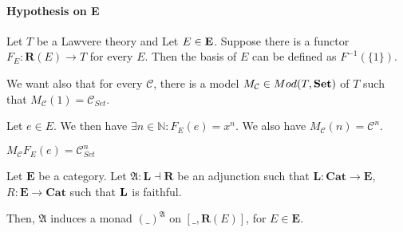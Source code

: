 \documentclass{report}
\begin{document}
\paragraph{Hypothesis on E}
Let $T$ be a Lawvere theory and
Let $E\in \bf E$.   Suppose there is a functor $F_E : \textbf{R}(E) \rightarrow T$ for every $E$. Then the basis of $E$ can be defined as $F^{-1}(\{1\})$.

We want also that for every $\mathcal{C}$, there is a model  $M_{\mathcal{C}}\in Mod(T,\bf Set)$ of $T$ such that $M_\mathcal{C}(1) = \mathcal{C}_{Set}$.

Let $e\in E$. We then have $\exists n \in \mathbb{N}  : F_E(e) = x^n$.  We also have $M_\mathcal{C}(n) = \mathcal{C}^n$.

$M_\mathcal{C}F_E(e) = \mathcal{C}_{Set}^n$


\begin{thm}
    Let $\textbf{E}$ be a category.
    Let $\mathfrak{A} : \textbf{L}\dashv \textbf{R}$ be an adjunction such that $\textbf{L} : \textbf{Cat} \rightarrow \textbf{E}$, $R : \textbf{E} \rightarrow \textbf{Cat}$  such that $\bf L$ is faithful.

    Then, $\mathfrak{A}$ induces a monad $(\_)^\mathfrak{A}$ on $[\_,\textbf{R}(E)]$, for $E \in \textbf{E}$.
\end{thm}
\end{document}
